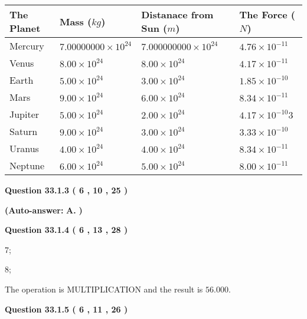 \documentclass[12pt]{article}
\begin{document}
 
\begin{tabular}{|l|l|l|l|}
\hline
The Planet & Mass ($kg$) & Distanace from Sun ($m$) & The Force ($N$)\\
\hline
Mercury  &
           $ %
7.00000000 \times 10^{24}  $   &
             $ %
7.000000000 \times 10^{24}$    & $ %
4.76 \times 10^{-11} $
\\  \hline
Venus    &
           $  %
8.00 \times 10^{24}  $     &
             $ %
8.00 \times 10^{24} $    & $ %
4.17 \times 10^{-11} $
\\  \hline
Earth    &
           $  %
5.00 \times 10^{24}$     &
             $ %
3.00 \times 10^{24} $    & $ %
1.85 \times 10^{-10} $
\\   \hline
Mars     &
           $  %
9.00 \times 10^{24} $     &
             $ %
6.00 \times 10^{24}$    & $ %
8.34 \times 10^{-11} $
\\   \hline
Jupiter  &
           $  %
5.00 \times 10^{24}  $    &
             $ %
2.00 \times 10^{24} $    & $ %
4.17 \times 10^{-10}3 $
\\  \hline
Saturn   &
           $  %
9.00 \times 10^{24}   $    &
             $ %
3.00 \times 10^{24}  $    & $ %
3.33 \times 10^{-10} $
\\  \hline
Uranus   &
           $  %
4.00 \times 10^{24} $    &
             $ %
4.00 \times 10^{24}$    & $ %
8.34 \times 10^{-11} $
\\  \hline
Neptune  &
           $  %
6.00 \times 10^{24}  $    &
             $ %
5.00 \times 10^{24} $    & $ %
8.00 \times 10^{-11} $
\\  \hline
 
\end{tabular}
 
 
  
  
{\textbf{\large{Question
33.1.3 
 (           6 ,          10 ,          25 )
}}}
 
 
{\textbf{(Auto-answer:}}
{\textbf{\large{
A.}}}
{\textbf{)}}
 
 
  
  
{\textbf{\large{Question
33.1.4 
 (           6 ,          13 ,          28 )
}}}

7;
 
8;
 
The operation is  %
MULTIPLICATION and the result is
$ %
56.000$.
 
  
  
{\textbf{\large{Question
33.1.5 
 (           6 ,          11 ,          26 )
}}}
\end{document}
